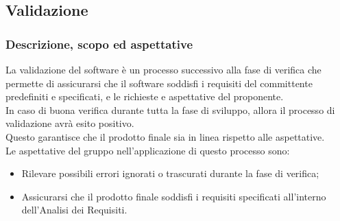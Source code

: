 \subsection{Validazione}

\subsubsection{Descrizione, scopo ed aspettative}

La validazione del software è un processo successivo alla fase di verifica che permette di assicurarsi che il software soddisfi i requisiti del committente predefiniti e specificati,
e le richieste e aspettative del proponente. \\

In caso di buona verifica durante tutta la fase di sviluppo, allora il processo di validazione avrà esito positivo. \\
Questo garantisce che il prodotto finale sia in linea rispetto alle aspettative. \\

Le aspettative del gruppo nell'applicazione di questo processo sono:
\begin{itemize}
    \item Rilevare possibili errori ignorati o trascurati durante la fase di verifica;
    \item Assicurarsi che il prodotto finale soddisfi i requisiti specificati all'interno dell'Analisi dei Requisiti.
\end{itemize}

